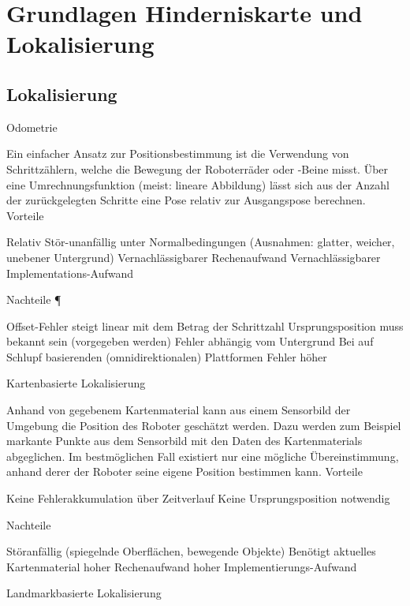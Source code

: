 \section{Grundlagen Hinderniskarte und Lokalisierung}
\label{lokalisierung_grundlagen_sec}
\authorsection{\editordummy}
\subsection{Lokalisierung}
 Odometrie

Ein einfacher Ansatz zur Positionsbestimmung ist die Verwendung von Schrittzählern, welche die Bewegung der Roboterräder oder -Beine misst. Über eine Umrechnungsfunktion (meist: lineare Abbildung) lässt sich aus der Anzahl der zurückgelegten Schritte eine Pose relativ zur Ausgangspose berechnen.
Vorteile

    Relativ Stör-unanfällig unter Normalbedingungen (Ausnahmen: glatter, weicher, unebener Untergrund)
    Vernachlässigbarer Rechenaufwand
    Vernachlässigbarer Implementations-Aufwand 

Nachteile ¶

    Offset-Fehler steigt linear mit dem Betrag der Schrittzahl
    Ursprungsposition muss bekannt sein (vorgegeben werden)
    Fehler abhängig vom Untergrund
    Bei auf Schlupf basierenden (omnidirektionalen) Plattformen Fehler höher 
    
Kartenbasierte Lokalisierung

Anhand von gegebenem Kartenmaterial kann aus einem Sensorbild der Umgebung die Position des Roboter geschätzt werden. Dazu werden zum Beispiel markante Punkte aus dem Sensorbild mit den Daten des Kartenmaterials abgeglichen. Im bestmöglichen Fall existiert nur eine mögliche Übereinstimmung, anhand derer der Roboter seine eigene Position bestimmen kann.
Vorteile

    Keine Fehlerakkumulation über Zeitverlauf
    Keine Ursprungsposition notwendig 

Nachteile

    Störanfällig (spiegelnde Oberflächen, bewegende Objekte)
    Benötigt aktuelles Kartenmaterial
    hoher Rechenaufwand
    hoher Implementierungs-Aufwand 
    
Landmarkbasierte Lokalisierung


